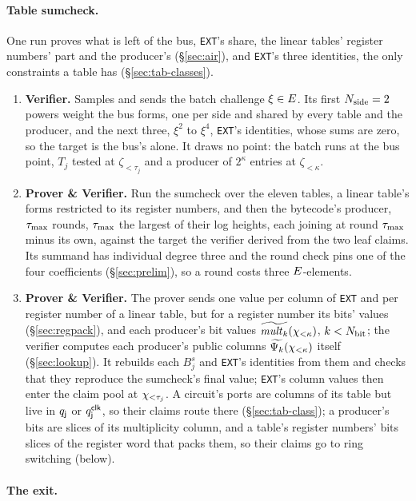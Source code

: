 \paragraph{Table sumcheck.} One run proves what is left of the bus, \texttt{EXT}'s share, the linear tables' register numbers' part and the producer's (\S\ref{sec:air}), and \texttt{EXT}'s three identities, the only constraints a table has (\S\ref{sec:tab-classes}).
\begin{enumerate}
\item \textbf{Verifier.} Samples and sends the batch challenge $\xi\in E$. Its first $N_{\mathrm{side}}=2$ powers weight the bus forms, one per side and shared by every table and the producer, and the next three, $\xi^{2}$ to $\xi^{4}$, \texttt{EXT}'s identities, whose sums are zero, so the target is the bus's alone. It draws no point: the batch runs at the bus point, $T_j$ tested at $\zeta_{<\tau_j}$ and a producer of $2^{\kappa}$ entries at $\zeta_{<\kappa}$.
\item \textbf{Prover \& Verifier.} Run the sumcheck over the eleven tables, a linear table's forms restricted to its register numbers, and then the bytecode's producer, $\tau_{\max}$ rounds, $\tau_{\max}$ the largest of their log heights, each joining at round $\tau_{\max}$ minus its own, against the target the verifier derived from the two leaf claims. Its summand has individual degree three and the round check pins one of the four coefficients (\S\ref{sec:prelim}), so a round costs three $E$-elements.
\item \textbf{Prover \& Verifier.} The prover sends one value per column of \texttt{EXT} and per register number of a linear table, but for a register number its bits' values (\S\ref{sec:regpack}), and each producer's bit values $\widetilde{\mathit{mult}_{k}}(\chi_{<\kappa})$, $k<N_{\mathrm{bit}}$; the verifier computes each producer's public columns $\widetilde{\Psi_{k}}(\chi_{<\kappa})$ itself (\S\ref{sec:lookup}). It rebuilds each $B^{s}_j$ and \texttt{EXT}'s identities from them and checks that they reproduce the sumcheck's final value; \texttt{EXT}'s column values then enter the claim pool at $\chi_{<\tau_j}$. A circuit's ports are columns of its table but live in $q_{\mathsf{j}}$ or $q^{\mathsf{clk}}_{\mathsf{j}}$, so their claims route there (\S\ref{sec:tab-class}); a producer's bits are slices of its multiplicity column, and a table's register numbers' bits slices of the register word that packs them, so their claims go to ring switching (below).
\end{enumerate}

\paragraph{The exit.}

